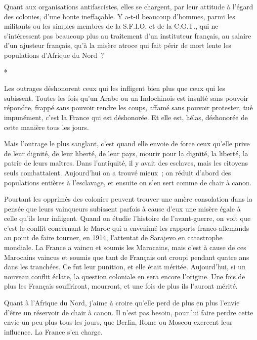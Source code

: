 \documentclass[french,twoside]{book} %
\begin{document}
Quant aux organisations antifascistes, elles se chargent, par leur attitude à l'égard des colonies, d'une honte ineffaçable. Y a-t-il beaucoup d'hommes, parmi les militants ou les simples membres de la S.F.I.O. et de la C.G.T., qui ne s'intéressent pas beaucoup plus au traitement d'un instituteur français, au salaire d'un ajusteur français, qu'à la misère atroce qui fait périr de mort lente les populations d'Afrique du Nord ?\par

\begin{center}
\noindent \centerline{*}\par
\end{center}

\noindent Les outrages déshonorent ceux qui les infligent bien plus que ceux qui les subissent. Toutes les fois qu'un Arabe ou un Indochinois est insulté sans pouvoir répondre, frappé sans pouvoir rendre les coups, affamé sans pouvoir protester, tué impunément, c'est la France qui est déshonorée. Et elle est, hélas, déshonorée de cette manière tous les jours.\par
Mais l'outrage le plus sanglant, c'est quand elle envoie de force ceux qu'elle prive de leur dignité, de leur liberté, de leur pays, mourir pour la digni­té, la liberté, la patrie de leurs maîtres. Dans l'antiquité, il y avait des esclaves, mais les citoyens seuls combattaient. Aujourd'hui on a trouvé mieux ; on réduit d'abord des populations entières à l'esclavage, et ensuite on s'en sert comme de chair à canon.\par
Pourtant les opprimés des colonies peuvent trouver une amère consolation dans la pensée que leurs vainqueurs subissent parfois à cause d'eux une misère égale à celle qu'ils leur infligent. Quand on étudie l'histoire de l'avant-guerre, on voit que c'est le conflit concernant le Maroc qui a envenimé les rapports franco-allemands au point de faire tourner, en 1914, l'attentat de Sarajevo en catastrophe mondiale. La France a vaincu et soumis les Marocains, mais c'est à cause de ces Marocains vaincus et soumis que tant de Français ont croupi pendant quatre ans dans les tranchées. Ce fut leur punition, et elle était méritée. Aujourd'hui, si un nouveau conflit éclate, la question coloniale en sera encore l'origine. Une fois de plus les Français souffriront, mourront, et une fois de plus ils l'auront mérité.\par
Quant à l'Afrique du Nord, j'aime à croire qu'elle perd de plus en plus l'envie d'être un réservoir de chair à canon. Il n'est pas besoin, pour lui faire perdre cette envie un peu plus tous les jours, que Berlin, Rome ou Moscou exercent leur influence. La France s'en charge.\par
\end{document}

